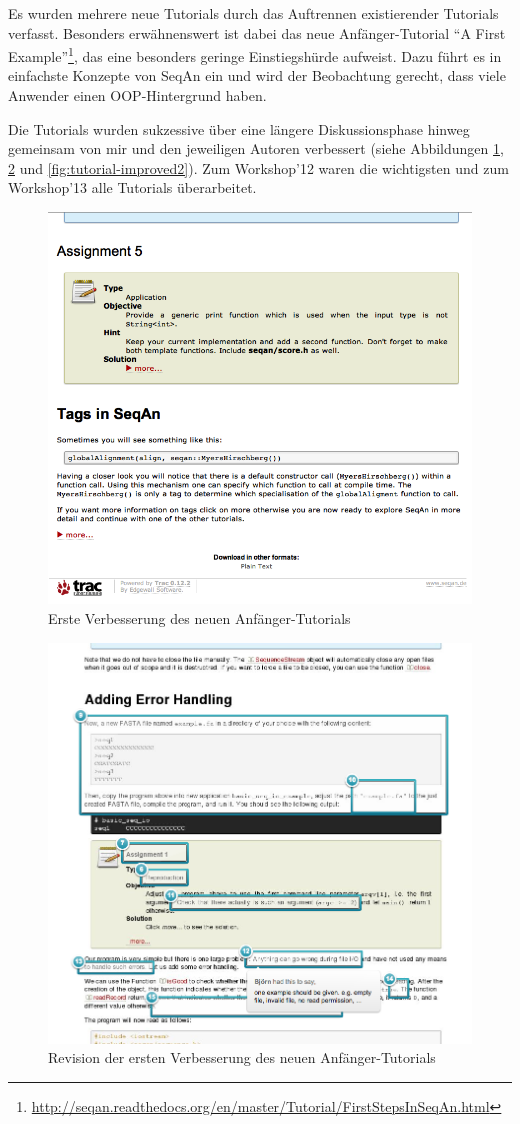 Es wurden mehrere neue Tutorials durch das Auftrennen existierender Tutorials verfasst. Besonders erwähnenswert ist dabei das neue Anfänger-Tutorial ``A First Example''\footnote{\url{http://seqan.readthedocs.org/en/master/Tutorial/FirstStepsInSeqAn.html}}, das eine besonders geringe Einstiegshürde aufweist. Dazu führt es in einfachste Konzepte von SeqAn ein und wird der Beobachtung gerecht, dass viele Anwender einen OOP-Hintergrund haben. 

Die Tutorials wurden sukzessive über eine längere Diskussionsphase hinweg gemeinsam von mir und den jeweiligen Autoren verbessert  (siehe Abbildungen \ref{fig:tutorial-improved}, \ref{fig:tutorial-revisioned} und \ref{fig:tutorial-improved2}). Zum Workshop'12 waren die wichtigsten und zum Workshop'13 alle Tutorials überarbeitet.

\begin{figure}
  \centering
    \includegraphics[width=0.57\linewidth]{Figures/tutorial-improved.png}
  \caption{Erste Verbesserung des neuen Anfänger-Tutorials}
  \label{fig:tutorial-improved}
\end{figure}

\begin{figure}
  \centering
    \includegraphics[width=0.65\linewidth]{Figures/tutorial-revisioned.png}
  \caption{Revision der ersten Verbesserung des neuen Anfänger-Tutorials}
  \label{fig:tutorial-revisioned}
\end{figure}

